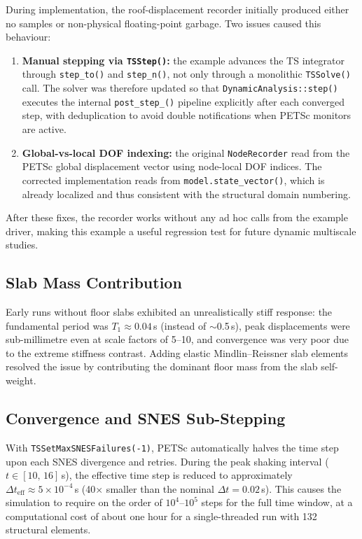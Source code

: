 During implementation, the roof-displacement recorder initially produced
either no samples or non-physical floating-point garbage.  Two issues
caused this behaviour:

\begin{enumerate}
  \item \textbf{Manual stepping via \texttt{TSStep()}:} the example advances
        the TS integrator through \texttt{step\_to()} and \texttt{step\_n()},
        not only through a monolithic \texttt{TSSolve()} call.  The solver was
        therefore updated so that \texttt{DynamicAnalysis::step()} executes the
        internal \texttt{post\_step\_()} pipeline explicitly after each
        converged step, with deduplication to avoid double notifications when
        PETSc monitors are active.
  \item \textbf{Global-vs-local DOF indexing:} the original
        \texttt{NodeRecorder} read from the PETSc global displacement vector
        using node-local DOF indices.  The corrected implementation reads from
        \texttt{model.state\_vector()}, which is already localized and thus
        consistent with the structural domain numbering.
\end{enumerate}

After these fixes, the recorder works without any ad hoc calls from the
example driver, making this example a useful regression test for future
dynamic multiscale studies.

\subsection{Slab Mass Contribution}
\label{sec:lshaped-slab-mass}

Early runs without floor slabs exhibited an unrealistically stiff response:
the fundamental period was $T_1 \approx 0.04$\,s (instead of
$\sim$0.5\,s), peak displacements were sub-millimetre even at scale
factors of 5--10, and convergence was very poor due to the extreme stiffness
contrast.  Adding elastic Mindlin--Reissner slab elements resolved the
issue by contributing the dominant floor mass from the slab self-weight.

\subsection{Convergence and SNES Sub-Stepping}
\label{sec:lshaped-convergence}

With \texttt{TSSetMaxSNESFailures(-1)}, PETSc automatically halves the
time step upon each SNES divergence and retries.  During the peak shaking
interval ($t \in [10,\,16]$\,s), the effective time step is reduced to
approximately $\Delta t_{\text{eff}} \approx 5 \times 10^{-4}$\,s
(40$\times$ smaller than the nominal $\Delta t = 0.02$\,s).  This causes
the simulation to require on the order of $10^4$--$10^5$ steps for
the full time window, at a computational cost of about one hour for a
single-threaded run with 132 structural elements.

